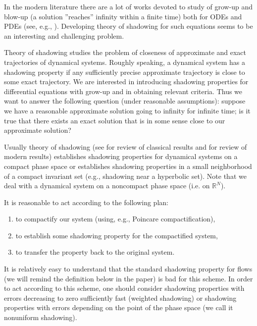 \documentclass[11pt]{article}
\theoremstyle{Mystyle}
\begin{document}
In the modern literature there are a lot of works devoted to study of grow-up and blow-up (a solution ''reaches'' infinity within a finite time) both for ODEs and PDEs (see, e.g., \cite{Ben, FM, VF}). Developing theory of shadowing for such equations seems to be an interesting and challenging problem.

Theory of shadowing studies the problem of closeness of approximate and exact trajectories of dynamical systems. Roughly speaking, a dynamical system has a shadowing property if any sufficiently precise approximate trajectory is close to some exact trajectory. 
We are interested in introducing shadowing properties for differential equations with grow-up and in obtaining relevant criteria. Thus we want to answer the following question (under reasonable assumptions): suppose we have a reasonable approximate solution going to infinity for infinite time; is it true that there exists an exact solution that is in some sense close to our approximate solution?

Usually theory of shadowing (see \cite{Palm, Pil} for review of classical results and \cite{Pil2} for review of modern results) establishes shadowing properties for dynamical systems on a compact phase space or establishes shadowing properties in a small neighborhood of a compact invariant set (e.g., shadowing near a hyperbolic set). Note that we deal with a dynamical system on a noncompact phase space (i.e. on $\mathbb{R}^N$).

It is reasonable to act according to the following plan:
\begin{enumerate}
	\item to compactify our system (using, e.g., Poincare compactification),
	\item to establish some shadowing property for the compactified system,
	\item to transfer the property back to the original system.
\end{enumerate}


It is relatively easy to understand that the standard shadowing property for flows (we will remind the definition below in the paper) is bad for this scheme. In order to act according to this scheme, one should consider shadowing properties with errors decreasing to zero sufficiently fast (weighted shadowing) or shadowing properties with errors depending on the point of the phase space (we call it nonuniform shadowing).
\end{document}
